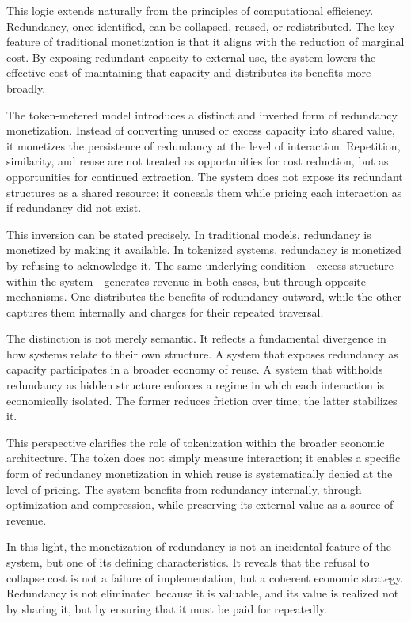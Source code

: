 \documentclass[12pt, oneside]{article}
\begin{document}
This logic extends naturally from the principles of computational efficiency. Redundancy, once identified, can be collapsed, reused, or redistributed. The key feature of traditional monetization is that it aligns with the reduction of marginal cost. By exposing redundant capacity to external use, the system lowers the effective cost of maintaining that capacity and distributes its benefits more broadly.

The token-metered model introduces a distinct and inverted form of redundancy monetization. Instead of converting unused or excess capacity into shared value, it monetizes the persistence of redundancy at the level of interaction. Repetition, similarity, and reuse are not treated as opportunities for cost reduction, but as opportunities for continued extraction. The system does not expose its redundant structures as a shared resource; it conceals them while pricing each interaction as if redundancy did not exist.

This inversion can be stated precisely. In traditional models, redundancy is monetized by making it available. In tokenized systems, redundancy is monetized by refusing to acknowledge it. The same underlying condition---excess structure within the system---generates revenue in both cases, but through opposite mechanisms. One distributes the benefits of redundancy outward, while the other captures them internally and charges for their repeated traversal.

The distinction is not merely semantic. It reflects a fundamental divergence in how systems relate to their own structure. A system that exposes redundancy as capacity participates in a broader economy of reuse. A system that withholds redundancy as hidden structure enforces a regime in which each interaction is economically isolated. The former reduces friction over time; the latter stabilizes it.

This perspective clarifies the role of tokenization within the broader economic architecture. The token does not simply measure interaction; it enables a specific form of redundancy monetization in which reuse is systematically denied at the level of pricing. The system benefits from redundancy internally, through optimization and compression, while preserving its external value as a source of revenue.

In this light, the monetization of redundancy is not an incidental feature of the system, but one of its defining characteristics. It reveals that the refusal to collapse cost is not a failure of implementation, but a coherent economic strategy. Redundancy is not eliminated because it is valuable, and its value is realized not by sharing it, but by ensuring that it must be paid for repeatedly.
\end{document}
